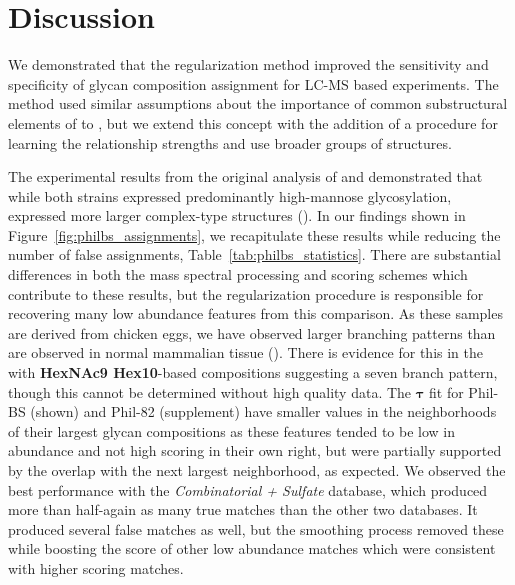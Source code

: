 \section{Discussion}

    We demonstrated that the regularization method improved the
    sensitivity and specificity of glycan composition assignment for
    LC-MS based experiments. The method used similar assumptions about
    the importance of common substructural elements of \nglycans to
    \citealp{Goldberg2009}, but we extend this concept with the addition
    of a procedure for learning the relationship strengths and use
    broader groups of structures.

    The experimental results from the original analysis of \philbs and
     demonstrated that while both strains expressed predominantly
    high-mannose glycosylation, \philbs expressed more larger complex-type
    structures (\citealp{Khatri2016a}). In our findings shown in Figure~\ref{fig:philbs_assignments},
    we recapitulate these results while reducing the number of false
    assignments, Table~\ref{tab:philbs_statistics}. There are substantial
    differences in both the mass spectral processing and scoring schemes which
    contribute to these results, but the regularization procedure is responsible
    for recovering many low abundance features from this comparison. As these
    samples are derived from chicken eggs, we have observed larger
    branching patterns than are observed in normal mammalian tissue (\citealp{Stanley2009}).
    There is evidence for this in the \philbs with \textbf{HexNAc9 Hex10}-based compositions
    suggesting a seven branch pattern, though this cannot be determined without high quality
    \msn\xspace data. The $\mathbf{\tau}$ fit for Phil-BS (shown) and Phil-82 (supplement) have
    smaller values in the neighborhoods of their largest glycan compositions as
    these features tended to be low in abundance and not high scoring in their own
    right, but were partially supported by the overlap with the next largest neighborhood,
    as expected. We observed the best performance with the \textit{Combinatorial + Sulfate}
    database, which produced more than half-again as many true matches than the other two
    databases. It produced several false matches as well, but the smoothing process removed
    these while boosting the score of other low abundance matches which were consistent with
    higher scoring matches.


